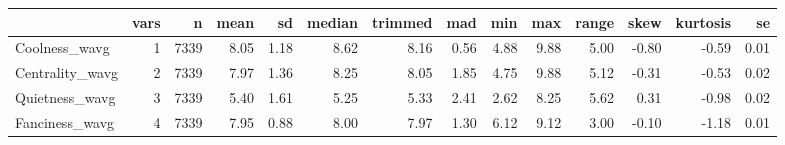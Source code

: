 
\begin{tabular}{lrrrrrrrrrrrrr}
\toprule
  & vars & n & mean & sd & median & trimmed & mad & min & max & range & skew & kurtosis & se\\
\midrule
Coolness\_wavg & 1 & 7339 & 8.05 & 1.18 & 8.62 & 8.16 & 0.56 & 4.88 & 9.88 & 5.00 & -0.80 & -0.59 & 0.01\\
Centrality\_wavg & 2 & 7339 & 7.97 & 1.36 & 8.25 & 8.05 & 1.85 & 4.75 & 9.88 & 5.12 & -0.31 & -0.53 & 0.02\\
Quietness\_wavg & 3 & 7339 & 5.40 & 1.61 & 5.25 & 5.33 & 2.41 & 2.62 & 8.25 & 5.62 & 0.31 & -0.98 & 0.02\\
Fanciness\_wavg & 4 & 7339 & 7.95 & 0.88 & 8.00 & 7.97 & 1.30 & 6.12 & 9.12 & 3.00 & -0.10 & -1.18 & 0.01\\
\bottomrule
\end{tabular}
